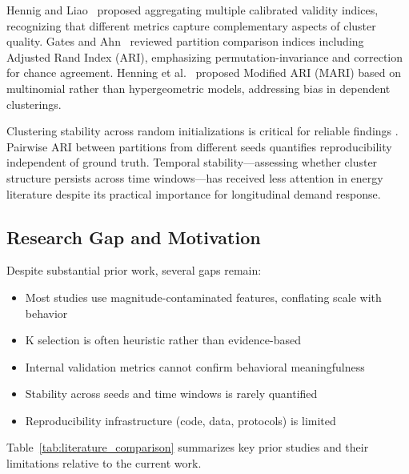 \documentclass[11pt,a4paper]{article}
\begin{document}
Hennig and Liao~\cite{hennig2020comparing} proposed aggregating multiple calibrated validity indices, recognizing that different metrics capture complementary aspects of cluster quality. Gates and Ahn~\cite{gates2019adjusted} reviewed partition comparison indices including Adjusted Rand Index (ARI), emphasizing permutation-invariance and correction for chance agreement. Henning et al.~\cite{henning2020adjusting} proposed Modified ARI (MARI) based on multinomial rather than hypergeometric models, addressing bias in dependent clusterings.

Clustering stability across random initializations is critical for reliable findings \cite{henning2020adjusting}. Pairwise ARI between partitions from different seeds quantifies reproducibility independent of ground truth. Temporal stability---assessing whether cluster structure persists across time windows---has received less attention in energy literature despite its practical importance for longitudinal demand response.

\subsection{Research Gap and Motivation}

Despite substantial prior work, several gaps remain:

\begin{itemize}
    \item Most studies use magnitude-contaminated features, conflating scale with behavior
    \item K selection is often heuristic rather than evidence-based
    \item Internal validation metrics cannot confirm behavioral meaningfulness
    \item Stability across seeds and time windows is rarely quantified
    \item Reproducibility infrastructure (code, data, protocols) is limited
\end{itemize}

Table~\ref{tab:literature_comparison} summarizes key prior studies and their limitations relative to the current work.
\end{document}
